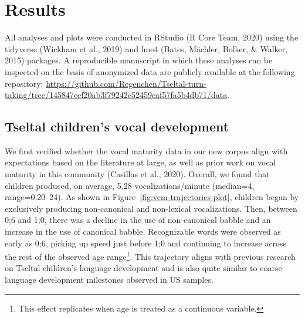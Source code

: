 \documentclass[
  man]{apa6}
\begin{document}
\hypertarget{results}{%
\section{Results}\label{results}}

All analyses and plots were conducted in RStudio (R Core Team, 2020) using the tidyverse (Wickham et al., 2019) and lme4 (Bates, Mächler, Bolker, \& Walker, 2015) packages. A reproducible manuscript in which these analyses can be inspected on the basis of anonymized data are publicly available at the following repository: \url{https://github.com/Regenchen/Tseltal-turn-taking/tree/145847cef20ab3f79242c52459eaf57fa5b4db71/data}.

\hypertarget{tseltal-childrens-vocal-development}{%
\subsection{Tseltal children's vocal development}\label{tseltal-childrens-vocal-development}}

We first verified whether the vocal maturity data in our new corpus align with expectations based on the literature at large, as well as prior work on vocal maturity in this community (Casillas et al., 2020). Overall, we found that children produced, on average, 5.28 vocalizations/minute (median=4, range=0.20--24). As shown in Figure~\ref{fig:vcm-trajectories-plot}, children began by exclusively producing non-canonical and non-lexical vocalizations. Then, between 0;6 and 1;0, there was a decline in the use of non-canonical babble and an increase in the use of canonical babble. Recognizable words were observed as early as 0;6, picking up speed just before 1;0 and continuing to increase across the rest of the observed age range\footnote{This effect replicates when age is treated as a continuous variable.}. This trajectory aligns with previous research on Tseltal children's language development and is also quite similar to coarse language development milestones observed in US samples.
\end{document}
